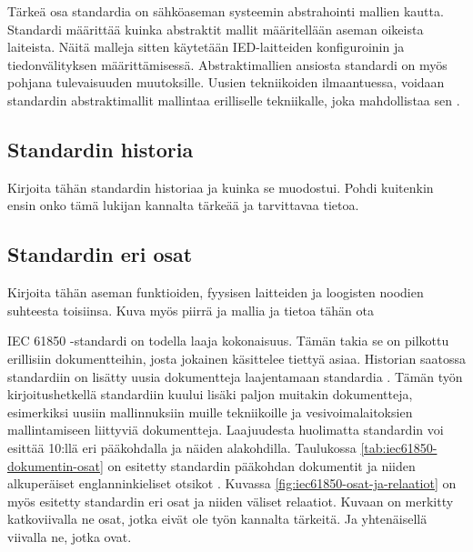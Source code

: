 Tärkeä osa standardia on sähköaseman systeemin abstrahointi mallien kautta. Standardi määrittää kuinka abstraktit mallit määritellään aseman oikeista laiteista. Näitä malleja sitten käytetään IED-laitteiden konfiguroinin ja tiedonvälityksen määrittämisessä. Abstraktimallien ansiosta standardi on myös pohjana tulevaisuuden muutoksille. Uusien tekniikoiden ilmaantuessa, voidaan standardin abstraktimallit mallintaa erilliselle tekniikalle, joka mahdollistaa sen \cite[s.~2]{Brunner2008}.

\subsection{Standardin historia}
\begin{it}
	Kirjoita tähän standardin historiaa ja kuinka se muodostui. Pohdi kuitenkin ensin onko tämä lukijan kannalta tärkeää ja tarvittavaa tietoa.
\end{it}

\subsection{Standardin eri osat}

\begin{it}
	Kirjoita tähän aseman funktioiden, fyysisen laitteiden ja loogisten noodien suhteesta toisiinsa. Kuva myös piirrä ja mallia ja tietoa tähän ota \cite[s.~19]{IEC61850-1}
\end{it}
	
IEC 61850 -standardi on todella laaja kokonaisuus. Tämän takia se on pilkottu erillisiin dokumentteihin, josta jokainen käsittelee tiettyä asiaa. Historian saatossa standardiin on lisätty uusia dokumentteja laajentamaan standardia \cite{IEC61850series, New-documents-by-IEC-TC-57}. Tämän työn kirjoitushetkellä standardiin kuului lisäki paljon muitakin dokumentteja, esimerkiksi uusiin mallinnuksiin muille tekniikoille ja vesivoimalaitoksien mallintamiseen liittyviä dokumentteja. Laajuudesta huolimatta standardin voi esittää 10:llä eri pääkohdalla ja näiden alakohdilla. Taulukossa \ref{tab:iec61850-dokumentin-osat} on esitetty standardin pääkohdan dokumentit ja niiden alkuperäiset englanninkieliset otsikot \cite[s.~2]{Mackiewicz2006} \cite{IEC61850series}. Kuvassa \ref{fig:iec61850-osat-ja-relaatiot} on myös esitetty standardin eri osat ja niiden väliset relaatiot. Kuvaan on merkitty katkoviivalla ne osat, jotka eivät ole työn kannalta tärkeitä. Ja yhtenäisellä viivalla ne, jotka ovat.

